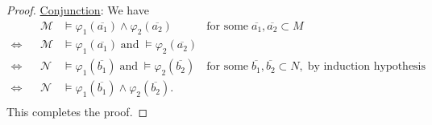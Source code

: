 \documentclass{article}
\begin{document}
\begin{enumerate}[label={\bf Q\arabic*:}]
\begin{proof}
      \underline{Conjunction}: We have
      \begin{align*}
                    && \mathcal{M}
                    & \models\varphi_1(\overline{a_1})\wedge\varphi_2(\overline{a_2})
                    & \text{for some}\; \overline{a_1},\overline{a_2}\subset M \\
        \Leftrightarrow && \mathcal{M}
                    & \models\varphi_1(\overline{a_1})\; \text{and}\;
                      \models\varphi_2(\overline{a_2}) & \\
        \Leftrightarrow && \mathcal{N}
                    & \models\varphi_1(\overline{b_1})\; \text{and}\;
                      \models\varphi_2(\overline{b_2})
                    & \text{for some}\;
                      \overline{b_1},\overline{b_2}\subset N,\; \text{by
                      induction hypothesis} \\
        \Leftrightarrow && \mathcal{N}
                    &
                    \models\varphi_1(\overline{b_1})\wedge\varphi_2(\overline{b_2}).
                    & \\
      \end{align*}
      This completes the proof.
    \end{proof}
\end{enumerate}
\end{document}
